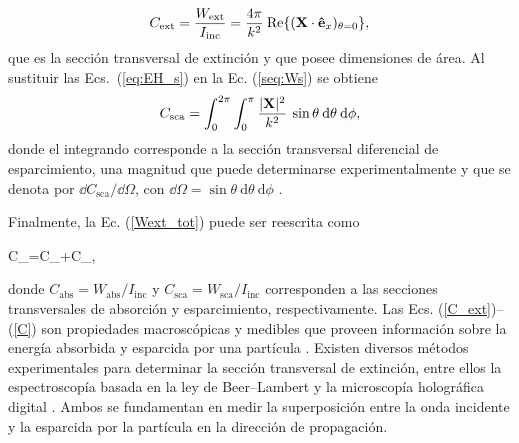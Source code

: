 %
\begin{equation}
	C_{\text{ext}}=\frac{W_{\text{ext}}}{I_{\text{inc}}}=\frac{4\pi}{k^2}\:\text{Re}\{(\vb{X}\cdot\vu{e}_x)_{\theta=0}\}, \label{C_ext}
\end{equation}
%
que es la sección transversal de extinción y que posee dimensiones de área.
 Al sustituir las Ecs.~(\ref{eq:EH_s}) en la Ec. (\ref{seq:Ws}) se obtiene
%
\begin{equation}
	C_{\text{sca}}=\int_0^{2\pi}\int_0^{\pi}\frac{|\vb{X}|^2}{k^2}\:\sin\theta\: \text{d}\theta\:\text{d}\phi,
	\label{C_sca_general}
\end{equation}
donde el integrando corresponde a la sección transversal diferencial de esparcimiento, una magnitud que puede determinarse experimentalmente \cite{kinnunenEffectSizeShape2011} y que se denota por $\dd{C_{\text{sca}}}/\dd{\Omega}$, con $\dd{\Omega}=\sin\theta\: \text{d}\theta\:\text{d}\phi$ \cite{bohrenAbsorptionScatteringLight2008}. 

%
\noindent Finalmente, la Ec. (\ref{Wext_tot}) puede ser reescrita como \cite{bohrenAbsorptionScatteringLight2008}
%
\begin{tcolorbox}
	C_{}=C_{}+C_{},
	\label{C} 
\end{tcolorbox}
%
\noindent donde $C_{\text{abs}}=W_{\text{abs}}/I_{\text{inc}}$ y $C_{\text{sca}}=W_{\text{sca}}/I_{\text{inc}}$ corresponden a las secciones transversales de absorción y esparcimiento, respectivamente.
Las Ecs. (\ref{C_ext})–(\ref{C}) son propiedades macroscópicas y medibles que proveen información sobre la energía absorbida y esparcida por una partícula \cite{bohrenAbsorptionScatteringLight2008}. Existen diversos métodos experimentales para determinar la sección transversal de extinción, entre ellos la espectroscopía basada en la ley de Beer–Lambert \cite{bohrenAbsorptionScatteringLight2008} y la microscopía holográfica digital \cite{subediMeasurementExtinctionCross2014}. Ambos se fundamentan en medir la superposición entre la onda incidente y la esparcida por la partícula en la dirección de propagación.

